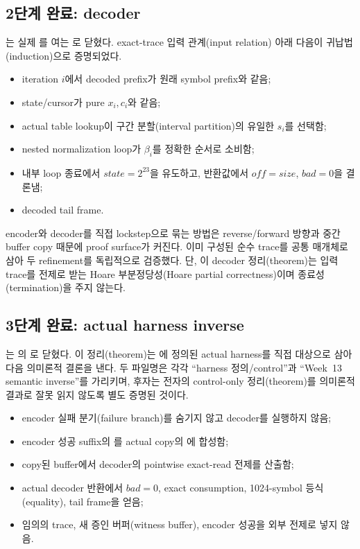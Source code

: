 \subsection{2단계 완료: decoder}

는 실제
를 여는
로 닫혔다. exact-trace 입력
관계(input relation) 아래 다음이 귀납법(induction)으로 증명되었다.

\begin{itemize}
  \item iteration \(i\)에서 decoded prefix가 원래 symbol prefix와 같음;
  \item state/cursor가 pure \(x_i,c_i\)와 같음;
  \item actual table lookup이 구간 분할(interval partition)의 유일한 \(s_i\)를 선택함;
  \item nested normalization loop가 \(\beta_i\)를 정확한 순서로 소비함;
  \item 내부 loop 종료에서 \(state=2^{23}\)을 유도하고, 반환값에서
        \(off=size\), \(bad=0\)을 결론냄;
  \item decoded tail frame.
\end{itemize}

encoder와 decoder를 직접 lockstep으로 묶는 방법은 reverse/forward 방향과
중간 buffer copy 때문에 proof surface가 커진다. 이미 구성된 순수 trace를
공통 매개체로 삼아 두 refinement를 독립적으로 검증했다. 단, 이 decoder
정리(theorem)는 입력 trace를 전제로 받는 Hoare 부분정당성(Hoare partial
correctness)이며 종료성(termination)을 주지 않는다.

\subsection{3단계 완료: actual harness inverse}

는
의
로 닫혔다. 이 정리(theorem)는
에 정의된 actual harness를 직접 대상으로
삼아 다음 의미론적 결론을 낸다. 두 파일명은 각각 ``harness 정의/control''과
``Week~13 semantic inverse''를 가리키며, 후자는 전자의 control-only 정리(theorem)를
의미론적 결과로 잘못 읽지 않도록 별도 증명된 것이다.

\begin{itemize}
  \item encoder 실패 분기(failure branch)를 숨기지 않고 decoder를 실행하지 않음;
  \item encoder 성공 suffix의 를 actual copy의
        에 합성함;
  \item copy된 buffer에서 decoder의 pointwise exact-read 전제를 산출함;
  \item actual decoder 반환에서 \(bad=0\), exact consumption, 1024-symbol
        등식(equality), tail frame을 얻음;
  \item 임의의 trace, 새 증인 버퍼(witness buffer), encoder 성공을 외부 전제로
        넣지 않음.
\end{itemize}

